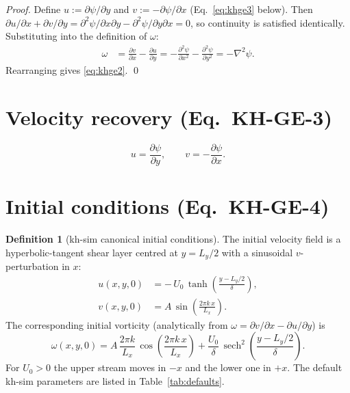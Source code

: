 \documentclass[11pt,a4paper]{article}
\theoremstyle{definition}
\newtheorem{definition}{Definition}
\theoremstyle{plain}
\begin{document}
\begin{proof}
Define $u := \partial \psi / \partial y$ and $v := -\partial \psi /
\partial x$ (Eq.\ \eqref{eq:khge3} below). Then
$\partial u/\partial x + \partial v/\partial y =
\partial^2 \psi / \partial x \partial y -
\partial^2 \psi / \partial y \partial x = 0$, so continuity is
satisfied identically. Substituting into the definition of $\omega$:
\begin{align*}
\omega
 &= \frac{\partial v}{\partial x} - \frac{\partial u}{\partial y}
  = -\frac{\partial^2 \psi}{\partial x^2} - \frac{\partial^2 \psi}{\partial y^2}
  = -\nabla^2 \psi.
\end{align*}
Rearranging gives \eqref{eq:khge2}.
\qed
\end{proof}

\section{Velocity recovery (Eq.\ KH-GE-3)}

\begin{equation}
\label{eq:khge3}
u = \frac{\partial \psi}{\partial y},
\qquad
v = -\frac{\partial \psi}{\partial x}.
\tag{KH-GE-3}
\end{equation}

\section{Initial conditions (Eq.\ KH-GE-4)}

\begin{definition}[kh-sim canonical initial conditions]
The initial velocity field is a hyperbolic-tangent shear layer
centred at $y = L_y/2$ with a sinusoidal $v$-perturbation in $x$:
\begin{align*}
u(x, y, 0) &= -\,U_0\,\tanh\!\left(\frac{y - L_y/2}{\delta}\right),\\
v(x, y, 0) &= A\,\sin\!\left(\frac{2\pi k\,x}{L_x}\right).
\end{align*}
The corresponding initial vorticity (analytically from
$\omega = \partial v/\partial x - \partial u/\partial y$) is
\begin{equation}
\label{eq:khge4}
\omega(x, y, 0) =
A\,\frac{2\pi k}{L_x}\,\cos\!\left(\frac{2\pi k\,x}{L_x}\right)
+ \frac{U_0}{\delta}\,\operatorname{sech}^2\!\left(\frac{y - L_y/2}{\delta}\right).
\tag{KH-GE-4}
\end{equation}
For $U_0 > 0$ the upper stream moves in $-x$ and the lower one in $+x$.
The default kh-sim parameters are listed in Table~\ref{tab:defaults}.
\end{definition}
\end{document}
